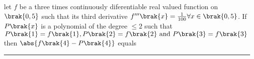 	\item 
	let $f$ be a three times continuously diferentiable real valued function on $\brak{0,5}$ such that its third derivative $f^{\prime\prime\prime}\brak{x} = \frac{1}{100} \forall x \in \brak{0,5}$. If $P\brak{x}$ is a polynomial of the degree $\leq 2$ such that $P\brak{1} = f\brak{1}, P\brak{2} = f\brak{2} \text{ and } P\brak{3} = f\brak{3}$ then $\abs{f\brak{4} - P\brak{4}}$ equals \rule{1cm}{0.1pt}

	\hfill{}

